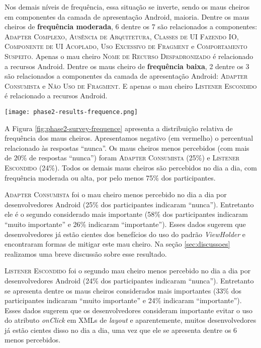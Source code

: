 Nos demais níveis de frequência, essa situação se inverte, sendo os maus cheiros em componentes da camada de apresentação Android, maioria. Dentre os maus cheiros de \textbf{\small frequência moderada}, 6 dentre os 7 são relacionados a componentes: \textsc{\small Adapter Complexo}, \textsc{\small Ausência de Arquitetura}, \textsc{\small Classes de UI Fazendo IO}, \textsc{\small Componente de UI Acoplado}, \textsc{\small Uso Excessivo de Fragment} e \textsc{\small Comportamento Suspeito}. Apenas o mau cheiro \textsc{\small Nome de Recurso Despadronizado} é relacionado a recursos Android. Dentre os maus cheiro de \textbf{\small frequência baixa}, 2 dentre os 3 são relacionados a componentes da camada de apresentação Android: \textsc{\small Adapter Consumista} e \textsc{\small Não Uso de Fragment}. E apenas o mau cheiro \textsc{\small Listener Escondido} é relacionado a recursos Android.

\begin{figure*}[!htb]
  \centering
  \texttt{[image: phase2-results-frequence.png]}
  \caption{Distribuição relativa de frequência dos maus cheiros propostos.}
  \label{fig:phase2-survey-frequence}
\end{figure*}

A Figura \ref{fig:phase2-survey-frequence} apresenta a distribuição relativa de frequência dos maus cheiros. Apresentamos negativo (em vermelho) o percentual relacionado às respostas ``nunca''. Os maus cheiros menos percebidos (com mais de 20\% de respostas ``nunca'') foram \textsc{\small Adapter Consumista} (25\%) e \textsc{\small Listener Escondido} (24\%). Todos os demais maus cheiros são percebidos no dia a dia, com frequência moderada ou alta, por pelo menos 75\% dos participantes.

\textsc{\small Adapter Consumista} foi o mau cheiro menos percebido no dia a dia por desenvolvedores Android (25\% dos participantes indicaram ``nunca''). Entretanto ele é o segundo considerado mais importante (58\% dos participantes indicaram ``muito importante'' e 26\% indicaram ``importante''). Esses dados sugerem que desenvolvedores já estão cientes dos benefícios do uso do padrão \textit{ViewHolder} \cite{AluraViewHolder} e encontraram formas de mitigar este mau cheiro. Na seção \ref{sec:discussoes} realizamos uma breve discussão sobre esse resultado. 

\textsc{\small Listener Escondido} foi o segundo mau cheiro menos percebido no dia a dia por desenvolvedores Android (24\% dos participantes indicaram ``nunca''). Entretanto se apresenta dentre os maus cheiros considerados mais importantes (33\% dos participantes indicaram ``muito importante'' e 24\% indicaram ``importante''). Esses dados sugerem que os desenvolvedores consideram importante evitar o uso do atributo \textit{onClick} em XMLs de \textit{layout} e aparentemente, muitos desenvolvedores já estão cientes disso no dia a dia, uma vez que ele se apresenta dentre os 6 menos percebidos. \\


